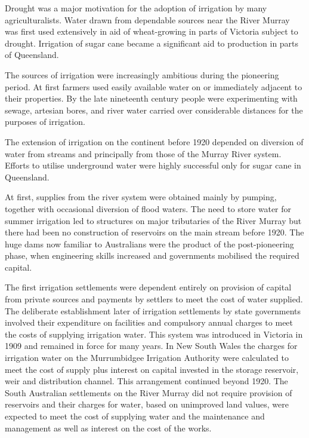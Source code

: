 Drought was a major motivation for the adoption of
irrigation by many agriculturalists. Water drawn from dependable
sources near the River Murray was first used
extensively in aid of wheat-growing in parts of Victoria
subject to drought. Irrigation of sugar cane became a significant aid to production in parts of
Queensland.

The sources of irrigation were increasingly ambitious during the
pioneering period. At first farmers used easily available water on or
immediately adjacent to their properties. By the late nineteenth
century people were experimenting with sewage, artesian
bores, and river water carried over
considerable distances for the purposes of irrigation.

The extension of irrigation on the continent before 1920 depended on
diversion of water from streams and principally from those of the
Murray River system.  Efforts to utilise
underground water were highly successful only for sugar cane in Queensland.

At first, supplies from the river system were obtained mainly by
pumping, together with occasional diversion of flood
waters.  The need to store water for summer irrigation led to
structures on major tributaries of the River Murray but there had been
no construction of reservoirs on the main
stream before 1920. The huge dams now familiar to Australians were the
product of the post-pioneering phase, when engineering skills
increased and governments mobilised the required capital.

\bigskip\noindent The first irrigation settlements were dependent
entirely on provision of capital from private sources and payments by
settlers to meet the cost of water supplied.  The deliberate
establishment later of irrigation settlements by state governments
involved their expenditure on facilities and compulsory annual charges
to meet the costs of supplying irrigation water.  This
system was introduced in Victoria in 1909 and remained in force for
many years.  In New South Wales the charges for irrigation water on
the Murrumbidgee Irrigation Authority were calculated to meet the cost
of supply plus interest on capital invested in the storage
reservoir, weir and distribution
channel.  This arrangement continued beyond
1920.  The South Australian settlements on the
River Murray did not require provision of
reservoirs and their charges for water,
based on unimproved land values, were expected to meet the cost of
supplying water and the maintenance and management as well as interest
on the cost of the works.

